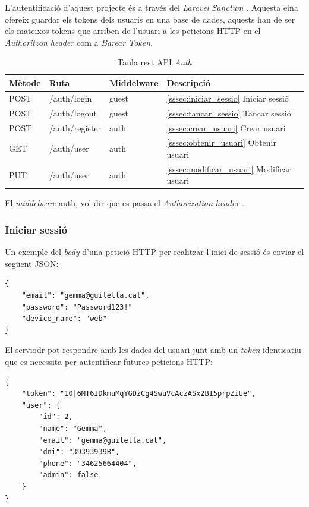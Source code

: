 L'autentificació d'aquest projecte és a través del \emph{Laravel Sanctum} \autocite{sanctum_laravel}.
Aquesta eina ofereix guardar els tokens dels usuaris en una base de dades, aquests han de ser els
mateixos tokens que arriben de l'usuari a les peticions HTTP  en el \emph{Authoritzon header} com a
\emph{Barear Token}.

\begin{table}[H]
\centering
\begin{tabular}{llll}
\hline
\textbf{Mètode} & \textbf{Ruta} & \textbf{Middelware} & \textbf{Descripció} \\ \hline
POST            & /auth/login     & guest &  \autoref{sssec:iniciar_sessio}{ Iniciar sessió}     \\ \hline
POST            & /auth/logout    & guest &  \autoref{sssec:tancar_sessio}{ Tancar sessió}     \\ \hline
POST            & /auth/register  & auth  &  \autoref{sssec:crear_usuari}{ Crear usuari}    \\ \hline
GET             & /auth/user      & auth  &  \autoref{sssec:obtenir_usuari}{ Obtenir usuari}    \\ \hline
PUT             & /auth/user      & auth  &  \autoref{sssec:modificar_usuari}{ Modificar usuari}  \\ \hline
\end{tabular}
\caption{Taula rest API \emph{Auth}}
\label{tab:my-auth-api-table}
\end{table}

El \emph{middelware} auth, vol dir que es passa el \emph{Authorization header} \autocite{middleware_laravel}.

\subsubsection{Iniciar sessió}
\label{sssec:iniciar_sessio}

Un exemple del \emph{body} d'una petició HTTP per realitzar l'inici de sessió és enviar
el següent JSON:

\begin{verbatim}
{
    "email": "gemma@guilella.cat",
    "password": "Password123!"
    "device_name": "web"
}
\end{verbatim}

El serviodr pot respondre amb les dades del usuari junt amb un \emph{token} identicatiu que es necessita per
autentificar futures peticions HTTP:
\begin{verbatim}
{
    "token": "10|6MT6IDkmuMqYGDzCg4SwuVcAczASx2BI5prpZiUe",
    "user": {
        "id": 2,
        "name": "Gemma",
        "email": "gemma@guilella.cat",
        "dni": "39393939B",
        "phone": "34625664404",
        "admin": false
    }
}
\end{verbatim}



